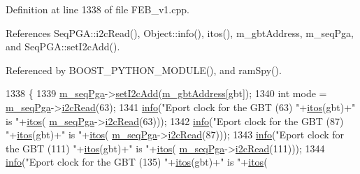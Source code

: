 Definition at line 1338 of file F\+E\+B\+\_\+v1.\+cpp.



References Seq\+P\+G\+A\+::i2c\+Read(), Object\+::info(), itos(), m\+\_\+gbt\+Address, m\+\_\+seq\+Pga, and Seq\+P\+G\+A\+::set\+I2c\+Add().



Referenced by B\+O\+O\+S\+T\+\_\+\+P\+Y\+T\+H\+O\+N\+\_\+\+M\+O\+D\+U\+L\+E(), and ram\+Spy().


\begin{DoxyCode}
1338                                       \{
1339   \hyperlink{classFEB__v1_a6c7804ac86796f233a8393043adf2e77}{m\_seqPga}->\hyperlink{classSeqPGA_a4ef334e4d2cb417b49033dce951728cd}{setI2cAdd}(\hyperlink{classFEB__v1_ac625855df976f16694178f1a4c0eef1e}{m\_gbtAddress}[gbt]);
1340   \textcolor{keywordtype}{int} mode = \hyperlink{classFEB__v1_a6c7804ac86796f233a8393043adf2e77}{m\_seqPga}->\hyperlink{classSeqPGA_a7cd344df2be99f3a02b487f80e87b27e}{i2cRead}(63);
1341   \hyperlink{classObject_a644fd329ea4cb85f54fa6846484b84a8}{info}(\textcolor{stringliteral}{"Eport clock for the GBT (63)  "}+\hyperlink{Tools_8h_af330027dbdafb9a30768b3613c553e60}{itos}(gbt)+\textcolor{stringliteral}{" is "}+\hyperlink{Tools_8h_af330027dbdafb9a30768b3613c553e60}{itos}(
      \hyperlink{classFEB__v1_a6c7804ac86796f233a8393043adf2e77}{m\_seqPga}->\hyperlink{classSeqPGA_a7cd344df2be99f3a02b487f80e87b27e}{i2cRead}(63)));
1342   \hyperlink{classObject_a644fd329ea4cb85f54fa6846484b84a8}{info}(\textcolor{stringliteral}{"Eport clock for the GBT (87)  "}+\hyperlink{Tools_8h_af330027dbdafb9a30768b3613c553e60}{itos}(gbt)+\textcolor{stringliteral}{" is "}+\hyperlink{Tools_8h_af330027dbdafb9a30768b3613c553e60}{itos}(
      \hyperlink{classFEB__v1_a6c7804ac86796f233a8393043adf2e77}{m\_seqPga}->\hyperlink{classSeqPGA_a7cd344df2be99f3a02b487f80e87b27e}{i2cRead}(87)));
1343   \hyperlink{classObject_a644fd329ea4cb85f54fa6846484b84a8}{info}(\textcolor{stringliteral}{"Eport clock for the GBT (111) "}+\hyperlink{Tools_8h_af330027dbdafb9a30768b3613c553e60}{itos}(gbt)+\textcolor{stringliteral}{" is "}+\hyperlink{Tools_8h_af330027dbdafb9a30768b3613c553e60}{itos}(
      \hyperlink{classFEB__v1_a6c7804ac86796f233a8393043adf2e77}{m\_seqPga}->\hyperlink{classSeqPGA_a7cd344df2be99f3a02b487f80e87b27e}{i2cRead}(111)));
1344   \hyperlink{classObject_a644fd329ea4cb85f54fa6846484b84a8}{info}(\textcolor{stringliteral}{"Eport clock for the GBT (135) "}+\hyperlink{Tools_8h_af330027dbdafb9a30768b3613c553e60}{itos}(gbt)+\textcolor{stringliteral}{" is "}+\hyperlink{Tools_8h_af330027dbdafb9a30768b3613c553e60}{itos}(

\end{DoxyCode}
